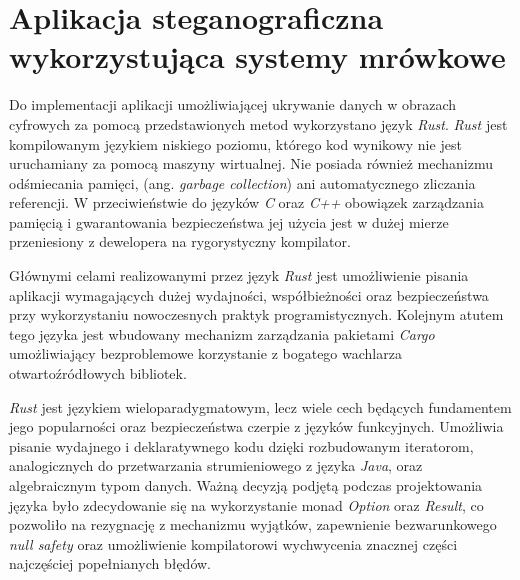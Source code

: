 \chapter{Aplikacja steganograficzna wykorzystująca systemy mrówkowe}\label{chap:implementation}
{

    Do implementacji aplikacji umożliwiającej ukrywanie danych w obrazach cyfrowych za pomocą przedstawionych metod
    wykorzystano język \textit{Rust}. \textit{Rust} jest kompilowanym językiem niskiego poziomu, którego kod wynikowy
    nie jest uruchamiany za pomocą maszyny wirtualnej. Nie posiada również mechanizmu odśmiecania pamięci, (ang.
    \textit{garbage collection}) ani automatycznego zliczania referencji. W przeciwieństwie do języków \textit{C} oraz
    \textit{C++} obowiązek zarządzania pamięcią i gwarantowania bezpieczeństwa jej użycia jest w dużej mierze
    przeniesiony z dewelopera na rygorystyczny kompilator.

    Głównymi celami realizowanymi przez język \textit{Rust} jest umożliwienie pisania aplikacji wymagających dużej
    wydajności, współbieżności oraz bezpieczeństwa przy wykorzystaniu nowoczesnych praktyk programistycznych. Kolejnym
    atutem tego języka jest wbudowany mechanizm zarządzania pakietami \textit{Cargo} umożliwiający bezproblemowe
    korzystanie z bogatego wachlarza otwartoźródłowych bibliotek.

    \textit{Rust} jest językiem wieloparadygmatowym, lecz wiele cech będących fundamentem jego popularności oraz
    bezpieczeństwa czerpie z języków funkcyjnych. Umożliwia pisanie wydajnego i deklaratywnego kodu dzięki rozbudowanym
    iteratorom, analogicznych do przetwarzania strumieniowego z języka \textit{Java}, oraz algebraicznym typom danych.
    Ważną decyzją podjętą podczas projektowania języka było zdecydowanie się na wykorzystanie monad \textit{Option} oraz
    \textit{Result}, co pozwoliło na rezygnację z mechanizmu wyjątków, zapewnienie bezwarunkowego \textit{null
    safety} oraz umożliwienie kompilatorowi wychwycenia znacznej części najczęściej popełnianych błędów.

}
